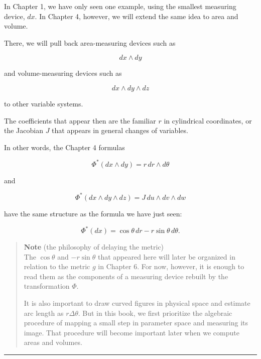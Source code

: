 In Chapter 1, we have only seen one example, using the smallest
measuring device, \(dx\). In Chapter 4, however, we will extend the same
idea to area and volume.

There, we will pull back area-measuring devices such as

\[
dx\wedge dy
\]

and volume-measuring devices such as

\[
dx\wedge dy\wedge dz
\]

to other variable systems.

The coefficients that appear then are the familiar \(r\) in cylindrical
coordinates, or the Jacobian \(J\) that appears in general changes of
variables.

In other words, the Chapter 4 formulas

\[
\Phi^*(dx\wedge dy)=r\,dr\wedge d\theta
\]

and

\[
\Phi^*(dx\wedge dy\wedge dz)=J\,du\wedge dv\wedge dw
\]

have the same structure as the formula we have just seen:

\[
\Phi^*(dx)
=
\cos\theta\,dr-r\sin\theta\,d\theta.
\]

\begin{quote}
\textbf{Note} (the philosophy of delaying the metric)\\
The \(\cos\theta\) and \(-r\sin\theta\) that appeared here will later be
organized in relation to the metric \(g\) in Chapter 6. For now,
however, it is enough to read them as the components of a measuring
device rebuilt by the transformation \(\Phi\).

It is also important to draw curved figures in physical space and
estimate arc length as \(r\Delta\theta\). But in this book, we first
prioritize the algebraic procedure of mapping a small step in parameter
space and measuring its image. That procedure will become important
later when we compute areas and volumes.
\end{quote}

\begin{center}\rule{0.5\linewidth}{0.5pt}\end{center}

